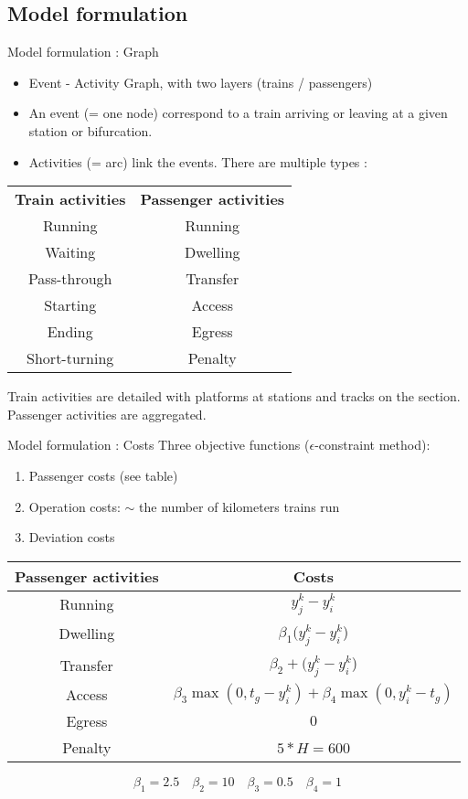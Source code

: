 \documentclass{EESD}
\begin{document}
\subsection{Model formulation}
\begin{frame}{Model formulation : Graph}
	\begin{itemize}
		\item Event - Activity Graph, with two layers (trains / passengers)
		\item An event (= one node) correspond to a train arriving or leaving at a given station or bifurcation.
		\item Activities (= arc) link the events. There are multiple types :
	\end{itemize}
	\begin{table}
		\centering
		\begin{tabular}{cc}
			\textbf{Train activities} & \textbf{Passenger activities} \\
			\cmidrule{1-1}\cmidrule{2-2}
			Running & Running \\
			Waiting & Dwelling \\
			Pass-through & Transfer\\
			Starting & Access \\
			Ending & Egress \\
			Short-turning & Penalty \\
		\end{tabular}
	\end{table}
	Train activities are detailed with platforms at stations and tracks on the section.\\
	Passenger activities are aggregated.
\end{frame}

\begin{frame}{Model formulation : Costs}
	Three objective functions ($\epsilon$-constraint method):
	\begin{enumerate}
		\item Passenger costs (see table)
		\item Operation costs: $\sim$ the number of kilometers trains run 
		\item Deviation costs
	\end{enumerate}
	\begin{table}
		\centering
		\begin{tabular}{cc}
			\textbf{Passenger activities} & \textbf{Costs} \\
			\midrule
			Running & $y_j^k - y_i^k$\\
			Dwelling & $\beta_1 (y_j^k - y_i^k$)\\
			Transfer& $\beta_2 + (y_j^k - y_i^k$)\\
			Access & $\beta_3 \max(0, t_g - y_i^k) + \beta_4 \max(0, y_i^k - t_g)$\\
			Egress & $0$\\
			Penalty & $5 * H = 600$\\
		\end{tabular}
	\end{table}
	$$\beta_1 = 2.5 \quad \beta_2 = 10 \quad \beta_3 = 0.5 \quad \beta_4 = 1$$
\end{frame}
\end{document}
